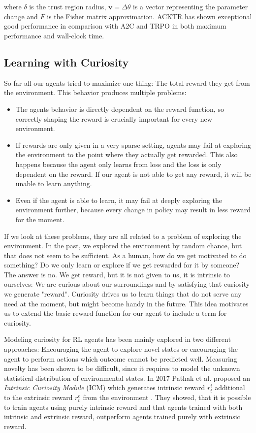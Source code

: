 where $\delta$ is the trust region radius, $\mathbf{v} = \Delta\theta$ is a vector representing the parameter change and $\hat{F}$ is the Fisher matrix approximation.
ACKTR has shown exceptional good performance in comparison with A2C and TRPO in both maximum performance and wall-clock time.


\subsection{Learning with Curiosity} \label{ssec:Curiosity}
So far all our agents tried to maximize one thing: The total reward they get from the environment. This behavior produces multiple problems: 

\begin{itemize}
  \item The agents behavior is directly dependent on the reward function, so correctly shaping the reward is crucially important for every new environment.
  \item If rewards are only given in a very sparse setting, agents may fail at exploring the environment to the point where they actually get rewarded. This also happens because the agent only learns from loss and the loss is only dependent on the reward. If our agent is not able to get any reward, it will be unable to learn anything.
  \item Even if the agent is able to learn, it may fail at deeply exploring the environment further, because every change in policy may result in less reward for the moment.
\end{itemize}

If we look at these problems, they are all related to a problem of exploring the environment. In the past, we explored the environment by random chance, but that does not seem to be sufficient. As a human, how do we get motivated to do something? Do we only learn or explore if we get rewarded for it by someone? The answer is no. We get reward, but it is not given to us, it is intrinsic to ourselves: We are curious about our surroundings and by satisfying that curiosity we generate "reward". Curiosity drives us to learn things that do not serve any need at the moment, but might become handy in the future. This idea motivates us to extend the basic reward function for our agent to include a term for curiosity.

Modeling curiosity for RL agents has been mainly explored in two different approaches: Encouraging the agent to explore novel states or encouraging the agent to perform actions which outcome cannot be predicted well. Measuring novelty has been shown to be difficult, since it requires to model the unknown statistical distribution of environmental states. In 2017 Pathak et al. proposed an \textit{Intrinsic Curiosity Module} (ICM) which generates intrinsic reward $r^i_t$ additional to the extrinsic reward $r^e_t$ from the environment \cite{pathak2017curiosity}. They showed, that it is possible to train agents using purely intrinsic reward and that agents trained with both intrinsic and extrinsic reward, outperform agents trained purely with extrinsic reward.

